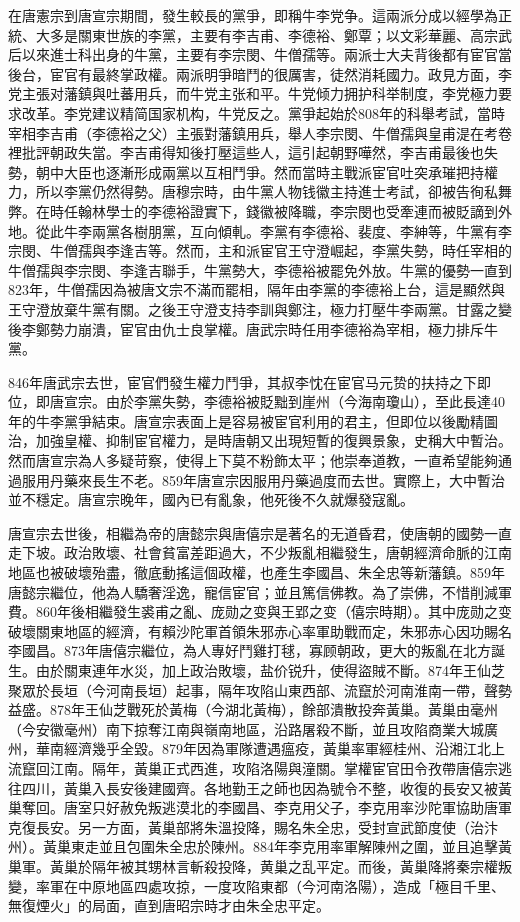 在唐憲宗到唐宣宗期間，發生較長的黨爭，即稱牛李党争。這兩派分成以經學為正統、大多是關東世族的李黨，主要有李吉甫、李德裕、鄭覃；以文彩華麗、高宗武后以來進士科出身的牛黨，主要有李宗閔、牛僧孺等。兩派士大夫背後都有宦官當後台，宦官有最終掌政權。兩派明爭暗鬥的很厲害，徒然消耗國力。政見方面，李党主張对藩鎮與吐蕃用兵，而牛党主张和平。牛党倾力拥护科举制度，李党極力要求改革。李党建议精简国家机构，牛党反之。黨爭起始於808年的科舉考試，當時宰相李吉甫（李德裕之父）主張對藩鎮用兵，舉人李宗閔、牛僧孺與皇甫湜在考卷裡批評朝政失當。李吉甫得知後打壓這些人，這引起朝野嘩然，李吉甫最後也失勢，朝中大臣也逐漸形成兩黨以互相鬥爭。然而當時主戰派宦官吐突承璀把持權力，所以李黨仍然得勢。唐穆宗時，由牛黨人物钱徽主持進士考試，卻被告徇私舞弊。在時任翰林學士的李德裕證實下，錢徽被降職，李宗閔也受牽連而被貶謫到外地。從此牛李兩黨各樹朋黨，互向傾軋。李黨有李德裕、裴度、李紳等，牛黨有李宗閔、牛僧孺與李逢吉等。然而，主和派宦官王守澄崛起，李黨失勢，時任宰相的牛僧孺與李宗閔、李逢吉聯手，牛黨勢大，李德裕被罷免外放。牛黨的優勢一直到823年，牛僧孺因為被唐文宗不滿而罷相，隔年由李黨的李德裕上台，這是顯然與王守澄放棄牛黨有關。之後王守澄支持李訓與鄭注，極力打壓牛李兩黨。甘露之變後李鄭勢力崩潰，宦官由仇士良掌權。唐武宗時任用李德裕為宰相，極力排斥牛黨。

846年唐武宗去世，宦官們發生權力鬥爭，其叔李忱在宦官马元贽的扶持之下即位，即唐宣宗。由於李黨失勢，李德裕被貶黜到崖州（今海南瓊山），至此長達40年的牛李黨爭結束。唐宣宗表面上是容易被宦官利用的君主，但即位以後勵精圖治，加強皇權、抑制宦官權力，是時唐朝又出現短暫的復興景象，史稱大中暫治。然而唐宣宗為人多疑苛察，使得上下莫不粉飾太平；他崇奉道教，一直希望能夠通過服用丹藥來長生不老。859年唐宣宗因服用丹藥過度而去世。實際上，大中暫治並不穩定。唐宣宗晚年，國內已有亂象，他死後不久就爆發寇亂。

唐宣宗去世後，相繼為帝的唐懿宗與唐僖宗是著名的无道昏君，使唐朝的國勢一直走下坡。政治敗壞、社會貧富差距過大，不少叛亂相繼發生，唐朝經濟命脈的江南地區也被破壞殆盡，徹底動搖這個政權，也產生李國昌、朱全忠等新藩鎮。859年唐懿宗繼位，他為人驕奢淫逸，寵信宦官；並且篤信佛教。為了崇佛，不惜削減軍費。860年後相繼發生裘甫之亂、庞勋之变與王郢之变（僖宗時期）。其中庞勋之变破壞關東地區的經濟，有賴沙陀軍首領朱邪赤心率軍助戰而定，朱邪赤心因功賜名李國昌。873年唐僖宗繼位，為人專好鬥雞打毬，寡顾朝政，更大的叛亂在北方誕生。由於關東連年水災，加上政治敗壞，盐价锐升，使得盜賊不斷。874年王仙芝聚眾於長垣（今河南長垣）起事，隔年攻陷山東西部、流竄於河南淮南一帶，聲勢益盛。878年王仙芝戰死於黃梅（今湖北黃梅），餘部潰散投奔黃巢。黃巢由毫州（今安徽毫州）南下掠奪江南與嶺南地區，沿路屠殺不斷，並且攻陷商業大城廣州，華南經濟幾乎全毀。879年因為軍隊遭遇瘟疫，黃巢率軍經桂州、沿湘江北上流竄回江南。隔年，黃巢正式西進，攻陷洛陽與潼關。掌權宦官田令孜帶唐僖宗逃往四川，黃巢入長安後建國齊。各地勤王之師也因為號令不整，收復的長安又被黃巢奪回。唐室只好赦免叛逃漠北的李國昌、李克用父子，李克用率沙陀軍協助唐軍克復長安。另一方面，黃巢部將朱溫投降，賜名朱全忠，受封宣武節度使（治汴州）。黃巢東走並且包圍朱全忠於陳州。884年李克用率軍解陳州之圍，並且追擊黃巢軍。黃巢於隔年被其甥林言斬殺投降，黄巢之乱平定。而後，黃巢降將秦宗權叛變，率軍在中原地區四處攻掠，一度攻陷東都（今河南洛陽），造成「極目千里、無復煙火」的局面，直到唐昭宗時才由朱全忠平定。

